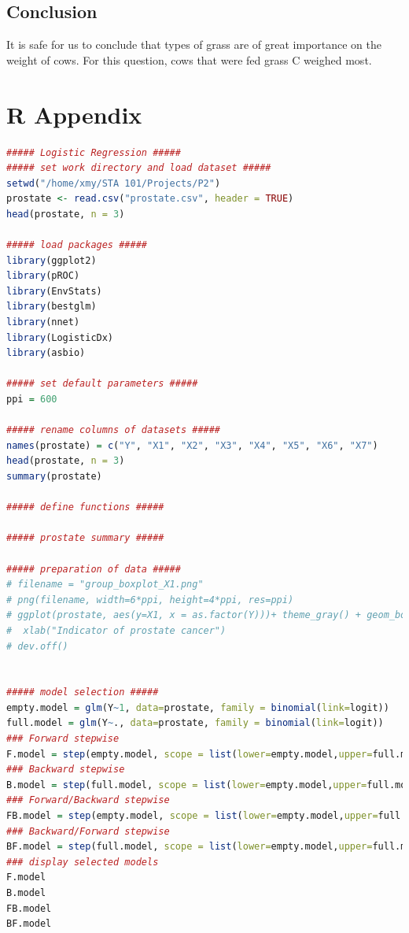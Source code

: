 \documentclass[a4paper,11pt,onecolumn,twoside]{article}
\begin{document}
\subsection{Conclusion}
It is safe for us to conclude that types of grass are of great importance on the weight of cows. For this question, cows that were fed grass C weighed most.\par

\section*{R Appendix}								
\begin{lstlisting}[language=R,caption={R script for Project 2}] 
##### Logistic Regression #####
##### set work directory and load dataset ##### 
setwd("/home/xmy/STA 101/Projects/P2")
prostate <- read.csv("prostate.csv", header = TRUE)
head(prostate, n = 3)

##### load packages #####
library(ggplot2)
library(pROC)
library(EnvStats)
library(bestglm)
library(nnet)
library(LogisticDx)
library(asbio)

##### set default parameters #####
ppi = 600

##### rename columns of datasets #####
names(prostate) = c("Y", "X1", "X2", "X3", "X4", "X5", "X6", "X7")
head(prostate, n = 3)
summary(prostate)

##### define functions #####

##### prostate summary #####

##### preparation of data #####
# filename = "group_boxplot_X1.png"
# png(filename, width=6*ppi, height=4*ppi, res=ppi)
# ggplot(prostate, aes(y=X1, x = as.factor(Y)))+ theme_gray() + geom_boxplot() + ylab("Serum prostate-specific antigen level") + 
#  xlab("Indicator of prostate cancer") 
# dev.off()


##### model selection #####
empty.model = glm(Y~1, data=prostate, family = binomial(link=logit))
full.model = glm(Y~., data=prostate, family = binomial(link=logit))
### Forward stepwise
F.model = step(empty.model, scope = list(lower=empty.model,upper=full.model),trace = FALSE, direction = "forward", criteria = "AIC")
### Backward stepwise
B.model = step(full.model, scope = list(lower=empty.model,upper=full.model),trace = FALSE, direction = "backward", criteria = "AIC")
### Forward/Backward stepwise
FB.model = step(empty.model, scope = list(lower=empty.model,upper=full.model),trace = FALSE, direction = "both", criteria = "AIC")
### Backward/Forward stepwise
BF.model = step(full.model, scope = list(lower=empty.model,upper=full.model),trace = FALSE, direction = "both", criteria = "AIC")
### display selected models
F.model
B.model
FB.model
BF.model


\end{lstlisting}
\end{document}
